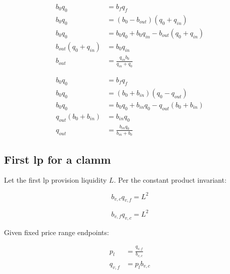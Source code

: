 \documentclass[table, twocolumn]{article}
\begin{document}
\begin{align}
  b_0 q_0               & = b_f q_f \nonumber                                      \\
  b_0 q_0               & = (b_0 - b_{out})(q_0 + q_{in}) \nonumber                \\
  b_0 q_0               & = b_0 q_0 + b_0 q_{in} - b_{out}(q_0 + q_{in}) \nonumber \\
  b_{out}(q_0 + q_{in}) & = b_{0} q_{in} \nonumber                                 \\
  b_{out}               & = \frac{q_{in} b_0}{q_{in} + q_0}
\end{align}

\begin{align}
  b_0 q_0               & = b_f q_f \nonumber                                      \\
  b_0 q_0               & = (b_0 + b_{in})(q_0 - q_{out}) \nonumber                \\
  b_0 q_0               & = b_0 q_0 + b_{in} q_0 - q_{out}(b_0 + b_{in}) \nonumber \\
  q_{out}(b_0 + b_{in}) & = b_{in} q_0 \nonumber                                   \\
  q_{out}               & = \frac{b_{in} q_0}{b_{in} + b_0}
\end{align}

\subsection{First \gls{lp} for a \gls{clamm}} \label{sec:first-lp-clamm-derivations}

Let the first \gls{lp} provision liquidity $L$. Per the constant product invariant:

\begin{equation} \label{eqn:first-lp-invariant-1}
  b_{v, c} q_{v, f} = L^2
\end{equation}

\begin{equation} \label{eqn:first-lp-invariant-2}
  b_{v, f} q_{v, c} = L^2
\end{equation}

Given fixed price range endpoints:

\begin{align} \label{eqn:first-lp-pl}
  p_l      & = \frac{q_{v, f}}{b_{v, c}} \nonumber \\
  q_{v, f} & = p_l b_{v, c}
\end{align}
\end{document}
